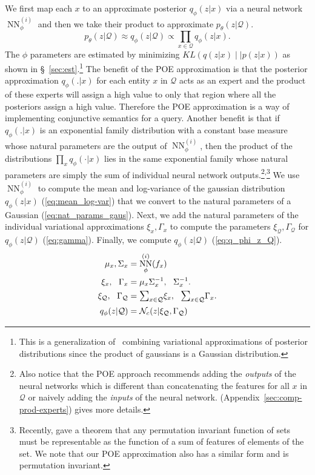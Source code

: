 \documentclass[a4paper]{article}
\newcommand{\appref}[1]{(Appendix~\ref{#1})}
\newcommand{\cNc}{\mathcal{N}_c}
\newcommand{\cQ}{\mathcal{Q}}
\DeclareMathOperator{\NN}{NN}
\newcommand{\infnn}{\NN^{(i)}_\phi}
\newcommand{\sumc}{\raisebox{-0.7ex}{$\mathlarger{\mathlarger{\mathlarger{\mathlarger{\Sigma}}}}$}}
\newcommand{\mynewcite}[1]{\cite{#1}}%
\newcommand{\myciteauthor}[1]{\cite{#1}}%
\begin{document}
We first map each $x$ to an approximate posterior $q_\phi(z|x)$ via a neural network $\infnn$ and then we take their product to approximate $p_\theta(z|\cQ)$.
\[
 p_{\theta}(z | \cQ) \approx q_\phi(z | \cQ) \propto \prod_{x \in \cQ} q_\phi(z | x).
\]
The $\phi$ parameters are estimated by minimizing $KL(q(z|x)\mid\mid p(z|x))$ as shown in \S~\ref{sec:est}.\footnote{ %
  This is a generalization of~\mynewcite{bouchacourt2017multi}
  combining variational approximations of posterior distributions
  since the product of gaussians is a Gaussian distribution.}
The benefit of the POE approximation is that the posterior approximation $q_\phi(.|x)$ for each entity $x$ in $\cQ$ acts as an expert and the product of these experts will assign a high value to only that region where all the posteriors assign a high value. Therefore the POE approximation is a way of implementing conjunctive semantics for a query.
Another benefit is that if $q_\phi(.|x)$ is an
exponential family distribution with a constant base measure whose natural parameters are the output of $\infnn$, then the product of the distributions $\prod_x q_\phi(\cdot |x)$ lies in the same exponential family whose natural parameters are simply the sum of individual neural network outputs.\footnote{Also notice that the POE approach recommends adding the \textit{outputs} of the neural networks which is different than concatenating the features for all $x$ in $\cQ$ or naively adding the \textit{inputs} of the neural network. \appref{sec:comp-prod-experts} gives more details.}\textsuperscript{,}\footnote{Recently, \myciteauthor{manzil2017deep} gave a theorem that any permutation invariant function of sets must be representable as the function of a sum of features of elements of the set. We note that our POE approximation also has a similar form and is permutation invariant.}
We use $\infnn$ to compute the mean and log-variance of the gaussian distribution $q_\phi(z  | x)$ (\ref{eq:mean_log-var}) that we
convert to the natural parameters of a Gaussian  (\ref{eq:nat_params_gaus}). %
Next, we add the natural parameters of the individual variational approximations $\xi_x, \Gamma_x$ to
compute the parameters $\xi_\cQ, \Gamma_\cQ$ for $q_\phi(z | \cQ)$
(\ref{eq:gamma}). %
Finally, we compute $q_\phi(z|\cQ)$ (\ref{eq:q_phi_z_Q}).
\begin{align}
  \mu_x, \Sigma_x &= \infnn(f_x)\label{eq:mean_log-var} \\
  \xi_x,\ \  \Gamma_x &= \mu_x  \Sigma_x^{-1},\ \  \Sigma_x^{-1}.\label{eq:nat_params_gaus} \\
  \xi_\cQ,\ \ \Gamma_\cQ &= \sumc_{x \in \cQ} \xi_x,\ \ \sumc_{x \in \cQ} \Gamma_x. \label{eq:gamma} \\
  {q_\phi(z|\cQ)} &= \cNc(z | \xi_\cQ, \Gamma_\cQ) \label{eq:q_phi_z_Q}
\end{align}
\end{document}
